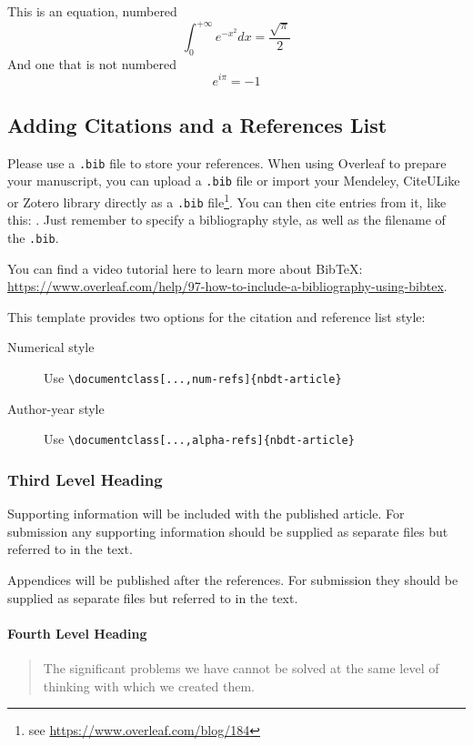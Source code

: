 \documentclass[num-refs]{nbdt-article}
\begin{document}
This is an equation, numbered
\begin{equation}
\int_0^{+\infty}e^{-x^2}dx=\frac{\sqrt{\pi}}{2}
\end{equation}
And one that is not numbered
\begin{equation*}
e^{i\pi}=-1
\end{equation*}

\subsection{Adding Citations and a References List}

Please use a \verb|.bib| file to store your references. When using Overleaf to prepare your manuscript, you can upload a \verb|.bib| file or import your Mendeley, CiteULike or Zotero library directly as a \verb|.bib| file\footnote{see \url{https://www.overleaf.com/blog/184}}. You can then cite entries from it, like this: \cite{lees2010theoretical}. Just remember to specify a bibliography style, as well as the filename of the \verb|.bib|.

You can find a video tutorial here to learn more about BibTeX: \url{https://www.overleaf.com/help/97-how-to-include-a-bibliography-using-bibtex}.

This template provides two options for the citation and reference list style: 
\begin{description}
\item[Numerical style] Use \verb|\documentclass[...,num-refs]{nbdt-article}|
\item[Author-year style] Use \verb|\documentclass[...,alpha-refs]{nbdt-article}|
\end{description}

\subsubsection{Third Level Heading}
Supporting information will be included with the published article. For submission any supporting information should be supplied as separate files but referred to in the text.

Appendices will be published after the references. For submission they should be supplied as separate files but referred to in the text.

\paragraph{Fourth Level Heading}
\begin{quote}
The significant problems we have cannot be solved at the same level of thinking with which we created them.
\end{quote}
\end{document}
